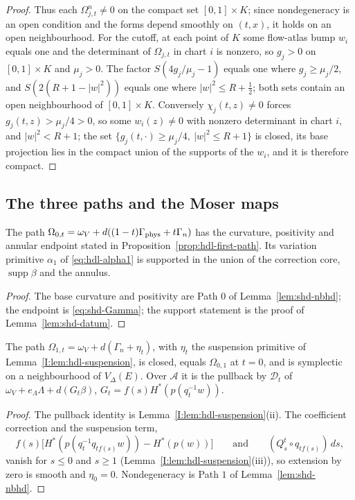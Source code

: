 \begin{proof}
Thus each $\Omega_{j,t}^n\ne0$ on the compact set $[0,1]\times K$; since nondegeneracy is an open condition and the forms
depend smoothly on $(t,x)$, it holds on an open neighbourhood. For the cutoff, at each point of $K$ some flow-atlas
bump $w_i$ equals one and the determinant of $\Omega_{j,t}$ in chart $i$ is nonzero, so $g_j>0$ on $[0,1]\times K$ and
$\mu_j>0$. The factor $S(4g_j/\mu_j-1)$ equals one where $g_j\ge\mu_j/2$, and $S(2(R+1-|w|^2))$ equals one where
$|w|^2\le R+\frac12$; both sets contain an open neighbourhood of $[0,1]\times K$. Conversely $\chi_j(t,z)\ne0$ forces
$g_j(t,z)>\mu_j/4>0$, so some $w_i(z)\ne0$ with nonzero determinant in chart $i$, and $|w|^2<R+1$; the set
$\{g_j(t,\cdot)\ge\mu_j/4,\ |w|^2\le R+1\}$ is closed, its base projection lies in the compact union of the supports of the $w_i$,
and it is therefore compact.
\end{proof}

\subsection{The three paths and the Moser maps}\label{sec:shd-first}

\begin{proposition}\label{prop:shd-first-path}
The path $\Omega_{0,t}=\omega_V+d((1-t)\Gamma_{\rm phys}+t\Gamma_n)$ has the curvature, positivity and annular endpoint
stated in Proposition~\ref{prop:hdl-first-path}. Its variation primitive $\alpha_1$ of \eqref{eq:hdl-alpha1}
is supported in the union of the correction core, $\operatorname{supp}\beta$ and the annulus.
\end{proposition}
\begin{proof}
The base curvature and positivity are Path $0$ of Lemma~\ref{lem:shd-nbhd}; the endpoint is \eqref{eq:shd-Gamma}; the support
statement is the proof of Lemma~\ref{lem:shd-datum}.
\end{proof}


\begin{proposition}\label{prop:shd-second-path}
The path $\Omega_{1,t}=\omega_V+d(\Gamma_n+\eta_t)$, with $\eta_t$ the suspension primitive of Lemma~\ref{I:lem:hdl-suspension},
is closed, equals $\Omega_{0,1}$ at $t=0$, and is symplectic on a neighbourhood of $V_\Delta(E)$. Over $\mathcal A$ it is the
pullback by $\mathcal D_t$ of $\omega_V+e_\Lambda\Lambda+d(G_t\beta)$, $G_t=f(s)H^*(p(q_t^{-1}w))$.
\end{proposition}
\begin{proof}
The pullback identity is Lemma~\ref{I:lem:hdl-suspension}(ii). The coefficient correction and the suspension term,
\[
 f(s)\bigl[H^*(p(q_t^{-1}q_{tf(s)}w))-H^*(p(w))\bigr]\qquad\text{and}\qquad(Q^t_s\circ q_{tf(s)})\,ds,
\]
vanish for $s\le0$ and $s\ge1$ (Lemma~\ref{I:lem:hdl-suspension}(iii)), so extension by zero is smooth and $\eta_0=0$. Nondegeneracy is Path $1$ of
Lemma~\ref{lem:shd-nbhd}.
\end{proof}


